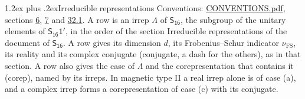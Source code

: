 \documentclass[10pt,a4paper]{article}
\makeatletter
\renewcommand\section{\@startsection{section}{1}{\z@}{-3ex plus -1ex minus -.2ex}%
  {1.2ex plus .2ex}{\normalfont\large\sffamily\bfseries\color{parttitle}}}
\numberwithin{equation}{section}
\newcommand{\grp}[1]{\mathsf{#1}}
\newcommand{\fsind}{\nu_{\mathrm{FS}}}
\makeatother
\begin{document}
\section{Irreducible representations}\label{s:irreps}
Conventions: \href{../../CONVENTIONS.pdf}{CONVENTIONS.pdf}, sections \href{../../../rotation/CONVENTIONS.pdf\#conv.6}{6}, \href{../../../rotation/CONVENTIONS.pdf\#conv.7}{7} and \href{../../CONVENTIONS.pdf\#conv.32.1}{32.1}.
\leavevmode\label{n:irrep.Delta}A row is an irrep $\Lambda$ of $\grp{S_{16}}$, the subgroup of the unitary elements of $\grp{S_{16}1'}$, in the order of the section Irreducible representations of the document of \href{../../../rotation/data/pdf/S16.pdf}{$\grp{S_{16}}$}. \label{n:index.dimension}\label{n:index.frobenius}\label{n:head.irrep}\label{n:head.reality}\label{n:head.conjugate}A row gives its dimension $d$, its Frobenius--Schur indicator $\fsind$, its reality and its complex conjugate (conjugate, a dash for the others), as in that section. \label{n:head.case.corep}\label{n:head.corep}A row also gives the case of $\Lambda$ and the corepresentation that contains it (corep), named by its irreps. In magnetic type II a real irrep alone is of case (a), and a complex irrep forms a corepresentation of case (c) with its conjugate.
\setlength{\emergencystretch}{2em}\par\setlength{\emergencystretch}{0pt}
\end{document}
